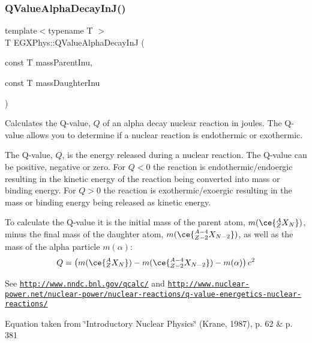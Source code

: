 \subsubsection{\texorpdfstring{Q\+Value\+Alpha\+Decay\+In\+J()}{QValueAlphaDecayInJ()}}
{\footnotesize\ttfamily template$<$typename T $>$ \\
T E\+G\+X\+Phys\+::\+Q\+Value\+Alpha\+Decay\+InJ (\begin{DoxyParamCaption}\item[{const T}]{mass\+Parent\+Inu,  }\item[{const T}]{mass\+Daughter\+Inu }\end{DoxyParamCaption})}



Calculates the Q-\/value, $Q$ of an alpha decay nuclear reaction in joules. The Q-\/value allows you to determine if a nuclear reaction is endothermic or exothermic. 

The Q-\/value, $Q$, is the energy released during a nuclear reaction. The Q-\/value can be positive, negative or zero. For $Q < 0$ the reaction is endothermic/endoergic resulting in the kinetic energy of the reaction being converted into mass or binding energy. For $Q > 0$ the reaction is exothermic/exoergic resulting in the mass or binding energy being released as kinetic energy.

To calculate the Q-\/value it is the initial mass of the parent atom, $m(\ce{ ^{A}_{Z}X_{N} })$, minus the final mass of the daughter atom, $m(\ce{ ^{A-4}_{Z-2}X_{N-2} })$, as well as the mass of the alpha particle $m(\alpha)$\+: \[Q = \left ( m(\ce{ ^{A}_{Z}X_{N} })-m(\ce{ ^{A-4}_{Z-2}X_{N-2} })-m(\alpha) \right) c^2\]

See \href{http://www.nndc.bnl.gov/qcalc/}{\tt http\+://www.\+nndc.\+bnl.\+gov/qcalc/} and \href{http://www.nuclear-power.net/nuclear-power/nuclear-reactions/q-value-energetics-nuclear-reactions/}{\tt http\+://www.\+nuclear-\/power.\+net/nuclear-\/power/nuclear-\/reactions/q-\/value-\/energetics-\/nuclear-\/reactions/}

Equation taken from \char`\"{}\+Introductory Nuclear Physics\char`\"{} (Krane, 1987), p. 62 \& p. 381


